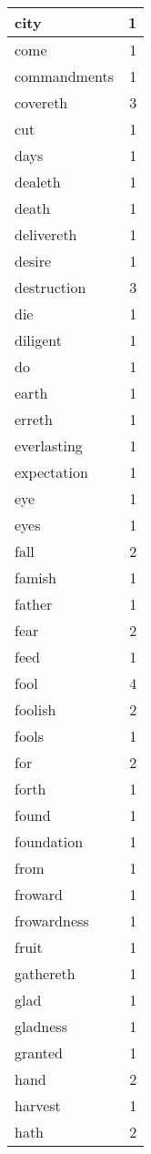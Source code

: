 \begin{center}
\begin{longtable}{l|r}
city & 1\\ \hline 
come & 1\\ \hline 
commandments & 1\\ \hline 
covereth & 3\\ \hline 
cut & 1\\ \hline 
days & 1\\ \hline 
dealeth & 1\\ \hline 
death & 1\\ \hline 
delivereth & 1\\ \hline 
desire & 1\\ \hline 
destruction & 3\\ \hline 
die & 1\\ \hline 
diligent & 1\\ \hline 
do & 1\\ \hline 
earth & 1\\ \hline 
erreth & 1\\ \hline 
everlasting & 1\\ \hline 
expectation & 1\\ \hline 
eye & 1\\ \hline 
eyes & 1\\ \hline 
fall & 2\\ \hline 
famish & 1\\ \hline 
father & 1\\ \hline 
fear & 2\\ \hline 
feed & 1\\ \hline 
fool & 4\\ \hline 
foolish & 2\\ \hline 
fools & 1\\ \hline 
for & 2\\ \hline 
forth & 1\\ \hline 
found & 1\\ \hline 
foundation & 1\\ \hline 
from & 1\\ \hline 
froward & 1\\ \hline 
frowardness & 1\\ \hline 
fruit & 1\\ \hline 
gathereth & 1\\ \hline 
glad & 1\\ \hline 
gladness & 1\\ \hline 
granted & 1\\ \hline 
hand & 2\\ \hline 
harvest & 1\\ \hline 
hath & 2\\ \hline 

\end{longtable}
\end{center}
